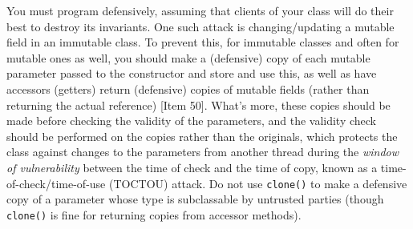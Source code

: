 \documentclass[8pt, table, xcdraw]{article}%
\begin{document}
You must program defensively, assuming that clients of your class will do their best to destroy its invariants. One such attack is changing/updating a mutable field in an immutable class. To prevent this, for immutable classes and often for mutable ones as well, you should make a (defensive) copy of each mutable parameter passed to the constructor and store and use this, as well as have accessors (getters) return (defensive) copies of mutable fields (rather than returning the actual reference) [Item 50]. What's more, these copies should be made before checking the validity of the parameters, and the validity check should be performed on the copies rather than the originals, which protects the class against changes to the parameters from another thread during the \emph{window of vulnerability} between the time of check and the time of copy, known as a time-of-check/time-of-use (TOCTOU) attack. Do not use \lstinline{clone()} to make a defensive copy of a parameter whose type is subclassable by untrusted parties (though \lstinline{clone()} is fine for returning copies from accessor methods).
\end{document}
